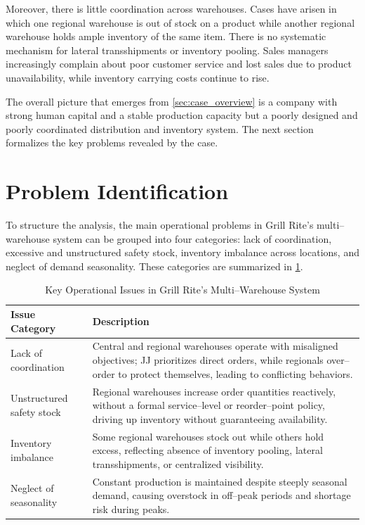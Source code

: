 \documentclass[12pt,a4paper]{article}
\begin{document}
Moreover, there is little coordination across warehouses. Cases have arisen in which one regional warehouse is out of stock on a product while another regional warehouse holds ample inventory of the same item. There is no systematic mechanism for lateral transshipments or inventory pooling. Sales managers increasingly complain about poor customer service and lost sales due to product unavailability, while inventory carrying costs continue to rise.

The overall picture that emerges from \cref{sec:case_overview} is a company with strong human capital and a stable production capacity but a poorly designed and poorly coordinated distribution and inventory system. The next section formalizes the key problems revealed by the case.

\section{Problem Identification}
\label{sec:problem_identification}

To structure the analysis, the main operational problems in Grill Rite’s multi–warehouse system can be grouped into four categories: lack of coordination, excessive and unstructured safety stock, inventory imbalance across locations, and neglect of demand seasonality. These categories are summarized in \cref{tab:key_issues}.

\begin{table}[H]
  \centering
  \caption{Key Operational Issues in Grill Rite's Multi–Warehouse System}
  \label{tab:key_issues}
  \begin{tabular}{p{} p{}}
    \toprule
    Issue Category & Description \\
    \midrule
    Lack of coordination &
    Central and regional warehouses operate with misaligned objectives; JJ prioritizes direct orders, while regionals over–order to protect themselves, leading to conflicting behaviors. \\[0.4em]
    Unstructured safety stock &
    Regional warehouses increase order quantities reactively, without a formal service–level or reorder–point policy, driving up inventory without guaranteeing availability. \\[0.4em]
    Inventory imbalance &
    Some regional warehouses stock out while others hold excess, reflecting absence of inventory pooling, lateral transshipments, or centralized visibility. \\[0.4em]
    Neglect of seasonality &
    Constant production is maintained despite steeply seasonal demand, causing overstock in off–peak periods and shortage risk during peaks. \\
    \bottomrule
  \end{tabular}
\end{table}
\end{document}
